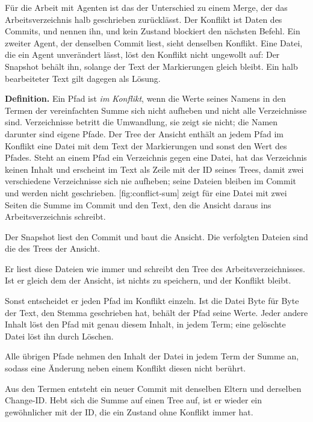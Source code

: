 Für die Arbeit mit Agenten ist das der Unterschied zu einem Merge, der das Arbeitsverzeichnis
halb geschrieben zurücklässt.
Der Konflikt ist Daten des Commits,  und  nennen ihn,
und kein Zustand  blockiert den nächsten Befehl.
Ein zweiter Agent, der denselben Commit liest, sieht denselben Konflikt.
Eine Datei, die ein Agent unverändert lässt, löst den Konflikt nicht ungewollt auf:
Der Snapshot behält ihn, solange der Text der Markierungen gleich bleibt.
Ein halb bearbeiteter Text gilt dagegen als Lösung.

{\bf Definition.} Ein Pfad ist {\em im Konflikt}, wenn die Werte seines Namens in den Termen der
vereinfachten Summe sich nicht aufheben und nicht alle Verzeichnisse sind. Verzeichnisse betritt
die Umwandlung, sie zeigt sie nicht; die Namen darunter sind eigene Pfade. Der Tree der Ansicht
enthält an jedem Pfad im Konflikt eine Datei mit dem Text der Markierungen und sonst den Wert
des Pfades. Steht an einem Pfad ein Verzeichnis gegen eine Datei, hat das Verzeichnis keinen
Inhalt und erscheint im Text als Zeile  mit der ID seines Trees, damit zwei
verschiedene Verzeichnisse sich nie aufheben; seine Dateien bleiben im Commit und
werden nicht geschrieben.
[fig:conflict-sum] zeigt für eine Datei mit zwei Seiten die Summe im Commit
und den Text, den die Ansicht daraus ins Arbeitsverzeichnis schreibt.

\startplacefigure[title={Die Summe von Trees eines Konflikts und der Text der Ansicht},
    reference=fig:conflict-sum,location=here]
\stopplacefigure

\startitemize[n]
\item Der Snapshot liest den Commit und baut die Ansicht. Die verfolgten Dateien sind die
des Trees der Ansicht.
\item Er liest diese Dateien wie immer und schreibt den Tree des Arbeitsverzeichnisses.
Ist er gleich dem der Ansicht, ist nichts zu speichern, und der Konflikt bleibt.
\item Sonst entscheidet er jeden Pfad im Konflikt einzeln. Ist die Datei Byte für Byte der Text,
den Stemma geschrieben hat, behält der Pfad seine Werte. Jeder andere Inhalt löst den Pfad
mit genau diesem Inhalt, in jedem Term; eine gelöschte Datei löst ihn durch Löschen.
\item Alle übrigen Pfade nehmen den Inhalt der Datei in jedem Term der Summe an,
sodass eine Änderung neben einem Konflikt diesen nicht berührt.
\item Aus den Termen entsteht ein neuer Commit mit denselben Eltern und derselben Change-ID.
Hebt sich die Summe auf einen Tree auf, ist er wieder ein gewöhnlicher 
mit der ID, die ein Zustand ohne Konflikt immer hat.
\stopitemize

